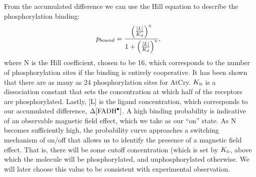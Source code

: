 \documentclass[twoside,twocolumn,9pt]{article}
\begin{document}
From the accumulated difference we can use the Hill equation to describe the phosphorylation binding: \cite{Phillips2009}
\begin{equation}
	p_{bound} = \frac{\left( \frac{[L]}{K_{d}} \right)^{\textsc{n}}}{1 + \left( \frac{[L]}{K_{d}} \right)^{\textsc{n}}},
	\label{eq:phosph}
\end{equation}
where N is the Hill coefficient, chosen to be 16, which corresponds to the number of phosphorylation sites if the binding is entirely cooperative. \cite{Phillips2009} It has been shown \cite{Liu2017} that there are as many as 24 phosphorylation sites for AtCry. $K_{\textsc{d}}$ is a dissociation constant that sets the concentration at which half of the receptors are phosphorylated. Lastly, [L] is the ligand concentration, which corresponds to our accumulated difference, $\Delta [\ce{FADH^{.}}]$. A high binding probability is indicative of an observable magnetic field effect, which we take as our ``on'' state. 
As N becomes sufficiently high, the probability curve approaches a switching mechanism of on/off that allows us to identify the presence of a magnetic field effect. That is, there will be some cutoff concentration (which is set by $K_{\textsc{d}}$, above which the molecule will be phosphorylated, and unphosphorylated otherwise. We will later choose this value to be consistent with experimental observation.

\end{document}
